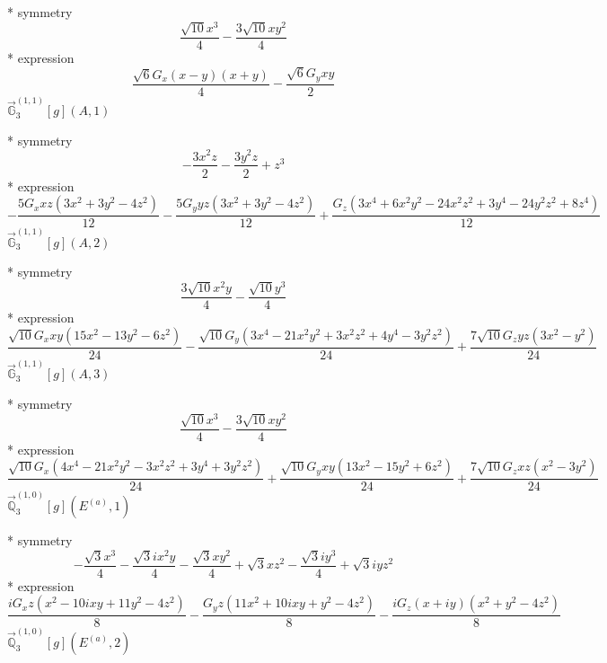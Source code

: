 \documentclass[fleqn,8pt]{jsarticle}
\begin{document}
\noindent\quad ** symmetry
\begin{dmath*}
\frac{\sqrt{10} x^{3}}{4} - \frac{3 \sqrt{10} x y^{2}}{4}
\end{dmath*}
\noindent\quad ** expression
\begin{dmath*}
\frac{\sqrt{6} G_{x} \left(x - y\right) \left(x + y\right)}{4} - \frac{\sqrt{6} G_{y} x y}{2}
\end{dmath*}
\noindent\quad $\vec{\mathbb{G}}_{3}^{(1,1)}[g](A,1)$

\noindent\quad ** symmetry
\begin{dmath*}
- \frac{3 x^{2} z}{2} - \frac{3 y^{2} z}{2} + z^{3}
\end{dmath*}
\noindent\quad ** expression
\begin{dmath*}
- \frac{5 G_{x} x z \left(3 x^{2} + 3 y^{2} - 4 z^{2}\right)}{12} - \frac{5 G_{y} y z \left(3 x^{2} + 3 y^{2} - 4 z^{2}\right)}{12} + \frac{G_{z} \left(3 x^{4} + 6 x^{2} y^{2} - 24 x^{2} z^{2} + 3 y^{4} - 24 y^{2} z^{2} + 8 z^{4}\right)}{12}
\end{dmath*}
\noindent\quad $\vec{\mathbb{G}}_{3}^{(1,1)}[g](A,2)$

\noindent\quad ** symmetry
\begin{dmath*}
\frac{3 \sqrt{10} x^{2} y}{4} - \frac{\sqrt{10} y^{3}}{4}
\end{dmath*}
\noindent\quad ** expression
\begin{dmath*}
\frac{\sqrt{10} G_{x} x y \left(15 x^{2} - 13 y^{2} - 6 z^{2}\right)}{24} - \frac{\sqrt{10} G_{y} \left(3 x^{4} - 21 x^{2} y^{2} + 3 x^{2} z^{2} + 4 y^{4} - 3 y^{2} z^{2}\right)}{24} + \frac{7 \sqrt{10} G_{z} y z \left(3 x^{2} - y^{2}\right)}{24}
\end{dmath*}
\noindent\quad $\vec{\mathbb{G}}_{3}^{(1,1)}[g](A,3)$

\noindent\quad ** symmetry
\begin{dmath*}
\frac{\sqrt{10} x^{3}}{4} - \frac{3 \sqrt{10} x y^{2}}{4}
\end{dmath*}
\noindent\quad ** expression
\begin{dmath*}
\frac{\sqrt{10} G_{x} \left(4 x^{4} - 21 x^{2} y^{2} - 3 x^{2} z^{2} + 3 y^{4} + 3 y^{2} z^{2}\right)}{24} + \frac{\sqrt{10} G_{y} x y \left(13 x^{2} - 15 y^{2} + 6 z^{2}\right)}{24} + \frac{7 \sqrt{10} G_{z} x z \left(x^{2} - 3 y^{2}\right)}{24}
\end{dmath*}
\noindent\quad $\vec{\mathbb{Q}}_{3}^{(1,0)}[g](E^{(a)},1)$

\noindent\quad ** symmetry
\begin{dmath*}
- \frac{\sqrt{3} x^{3}}{4} - \frac{\sqrt{3} i x^{2} y}{4} - \frac{\sqrt{3} x y^{2}}{4} + \sqrt{3} x z^{2} - \frac{\sqrt{3} i y^{3}}{4} + \sqrt{3} i y z^{2}
\end{dmath*}
\noindent\quad ** expression
\begin{dmath*}
\frac{i G_{x} z \left(x^{2} - 10 i x y + 11 y^{2} - 4 z^{2}\right)}{8} - \frac{G_{y} z \left(11 x^{2} + 10 i x y + y^{2} - 4 z^{2}\right)}{8} - \frac{i G_{z} \left(x + i y\right) \left(x^{2} + y^{2} - 4 z^{2}\right)}{8}
\end{dmath*}
\noindent\quad $\vec{\mathbb{Q}}_{3}^{(1,0)}[g](E^{(a)},2)$
\end{document}
